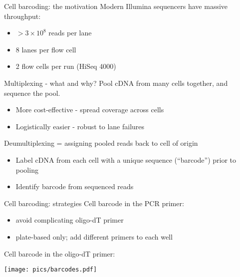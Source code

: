 \documentclass{beamer}
\begin{document}
\begin{frame}{Cell barcoding: the motivation}
Modern Illumina sequencers have massive throughput:
\begin{itemize}
\item $> 3 \times 10^8$ reads per lane 
\item 8 lanes per flow cell
\item 2 flow cells per run (HiSeq 4000)
\end{itemize}
\pause
\begin{exampleblock}{Multiplexing - what and why?}
Pool cDNA from many cells together, and sequence the pool.
\begin{itemize}
\item More cost-effective - spread coverage across cells
\item Logistically easier - robust to lane failures
\end{itemize}
\end{exampleblock}
\pause
Deumultiplexing = assigning pooled reads back to cell of origin
\begin{itemize}
\item Label cDNA from each cell with a unique sequence (``barcode'') prior to pooling
\item Identify barcode from sequenced reads
\end{itemize}
\end{frame}

\begin{frame}{Cell barcoding: strategies}
Cell barcode in the PCR primer:
\begin{itemize}
\item avoid complicating oligo-dT primer 
\item plate-based only; add different primers to each well
\end{itemize}
Cell barcode in the oligo-dT primer:
\begin{center}
\texttt{[image: pics/barcodes.pdf]}
\end{center}
\end{frame}
\end{document}
